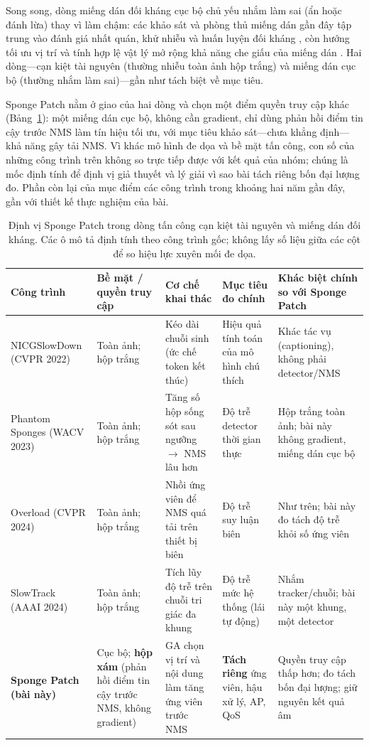 \documentclass[a4paper,fleqn]{cas-dc}
\begin{document}
Song song, dòng miếng dán đối kháng cục bộ chủ yếu nhắm làm sai (ẩn hoặc đánh lừa) thay vì làm chậm: các khảo sát và phòng thủ miếng dán gần đây tập trung vào đánh giá nhất quán, khử nhiễu và huấn luyện đối kháng \cite{apde2025,pbcat2025}, còn hướng tối ưu vị trí và tính hợp lệ vật lý mở rộng khả năng che giấu của miếng dán \cite{iap2025,badpatch2025}. Hai dòng---cạn kiệt tài nguyên (thường nhiễu toàn ảnh hộp trắng) và miếng dán cục bộ (thường nhắm làm sai)---gần như tách biệt về mục tiêu.

Sponge Patch nằm ở giao của hai dòng và chọn một điểm quyền truy cập khác (Bảng~\ref{tab:prior_attacks}): một miếng dán cục bộ, không cần gradient, chỉ dùng phản hồi điểm tin cậy trước NMS làm tín hiệu tối ưu, với mục tiêu khảo sát---chưa khẳng định---khả năng gây tải NMS. Vì khác mô hình đe dọa và bề mặt tấn công, con số của những công trình trên không so trực tiếp được với kết quả của nhóm; chúng là mốc định tính để định vị giả thuyết và lý giải vì sao bài tách riêng bốn đại lượng đo. Phần còn lại của mục điểm các công trình trong khoảng hai năm gần đây, gần với thiết kế thực nghiệm của bài.

\begin{table}[t]\centering\footnotesize
\setlength{\tabcolsep}{4pt}
\caption{Định vị Sponge Patch trong dòng tấn công cạn kiệt tài nguyên và miếng dán đối kháng. Các ô mô tả định tính theo công trình gốc; không lấy số liệu giữa các cột để so hiệu lực xuyên mối đe dọa.}
\label{tab:prior_attacks}
\begin{tabularx}{\textwidth}{@{}p{2.45cm}p{2.25cm}XXp{2.9cm}@{}}
\toprule
Công trình & Bề mặt / quyền truy cập & Cơ chế khai thác & Mục tiêu đo chính & Khác biệt chính so với Sponge Patch \\
\midrule
NICGSlowDown \cite{nicgslowdown2022} (CVPR 2022) & Toàn ảnh; hộp trắng & Kéo dài chuỗi sinh (ức chế token kết thúc) & Hiệu quả tính toán của mô hình chú thích & Khác tác vụ (captioning), không phải detector/NMS \\
Phantom Sponges \cite{phantom2023} (WACV 2023) & Toàn ảnh; hộp trắng & Tăng số hộp sống sót sau ngưỡng $\to$ NMS lâu hơn & Độ trễ detector thời gian thực & Hộp trắng toàn ảnh; bài này không gradient, miếng dán cục bộ \\
Overload \cite{overload2024} (CVPR 2024) & Toàn ảnh; hộp trắng & Nhồi ứng viên để NMS quá tải trên thiết bị biên & Độ trễ suy luận biên & Như trên; bài này đo tách độ trễ khỏi số ứng viên \\
SlowTrack \cite{slowtrack2024} (AAAI 2024) & Toàn ảnh; hộp trắng & Tích lũy độ trễ trên chuỗi tri giác đa khung & Độ trễ mức hệ thống (lái tự động) & Nhắm tracker/chuỗi; bài này một khung, một detector \\
\textbf{Sponge Patch (bài này)} & Cục bộ; \textbf{hộp xám} (phản hồi điểm tin cậy trước NMS, không gradient) & GA chọn vị trí và nội dung làm tăng ứng viên trước NMS & \textbf{Tách riêng} ứng viên, hậu xử lý, AP, QoS & Quyền truy cập thấp hơn; đo tách bốn đại lượng; giữ nguyên kết quả âm \\
\bottomrule
\end{tabularx}
\end{table}
\end{document}
